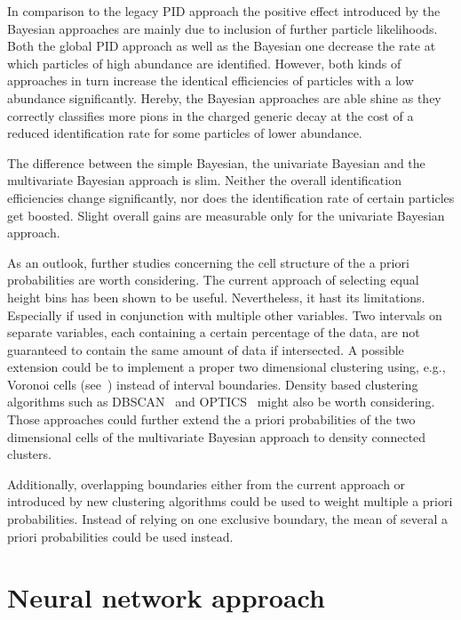 In comparison to the legacy PID approach the positive effect introduced by the Bayesian approaches are mainly due to inclusion of further particle likelihoods. Both the global PID approach as well as the Bayesian one decrease the rate at which particles of high abundance are identified. However, both kinds of approaches in turn increase the identical efficiencies of particles with a low abundance significantly. Hereby, the Bayesian approaches are able shine as they correctly classifies more pions in the charged generic decay at the cost of a reduced identification rate for some particles of lower abundance.

The difference between the simple Bayesian, the univariate Bayesian and the multivariate Bayesian approach is slim. Neither the overall identification efficiencies change significantly, nor does the identification rate of certain particles get boosted. Slight overall gains are measurable only for the univariate Bayesian approach.

As an outlook, further studies concerning the cell structure of the a priori probabilities are worth considering. The current approach of selecting equal height bins has been shown to be useful. Nevertheless, it hast its limitations. Especially if used in conjunction with multiple other variables. Two intervals on separate variables, each containing a certain percentage of the data, are not guaranteed to contain the same amount of data if intersected. A possible extension could be to implement a proper two dimensional clustering using, e.g., Voronoi cells (see~\cite{KnowledgeDiscoveryInDatabases1:Clustering}) instead of interval boundaries. Density based clustering algorithms such as DBSCAN~\cite{KnowledgeDiscoveryInDatabases1:Clustering} and OPTICS~\cite{KnowledgeDiscoveryInDatabases1:Clustering} might also be worth considering. Those approaches could further extend the a priori probabilities of the two dimensional cells of the multivariate Bayesian approach to density connected clusters.

Additionally, overlapping boundaries either from the current approach or introduced by new clustering algorithms could be used to weight multiple a priori probabilities. Instead of relying on one exclusive boundary, the mean of several a priori probabilities could be used instead.

\section{Neural network approach}
\label{sec:neural_network_approach}

